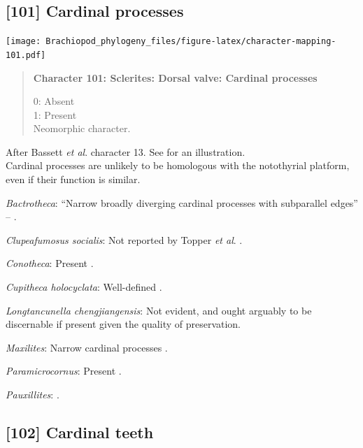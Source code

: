 \documentclass[openany]{book}
\begin{document}
\subsection*{{[}101{]} Cardinal processes}\label{cardinal-processes}

\texttt{[image: Brachiopod\_phylogeny\_files/figure-latex/character-mapping-101.pdf]}

\begin{quote}
\textbf{Character 101: Sclerites: Dorsal valve: Cardinal processes}

0: Absent\\
1: Present\\
Neomorphic character.
\end{quote}

After Bassett \emph{et al}.
\citeyearpar{Bassett2001Functionalmorphology} character 13. See
\citet{MartiMus2005} for an illustration.\\
Cardinal processes are unlikely to be homologous with the notothyrial
platform, even if their function is similar.

\hypertarget{Bactrotheca-coding-101}{}
\emph{Bactrotheca}: ``Narrow broadly diverging cardinal processes with
subparallel edges'' -- \citet{Valent2012}.

\hypertarget{Clupeafumosus_socialis-coding-101}{}
\emph{Clupeafumosus socialis}: Not reported by Topper \emph{et al}.
\citeyearpar{Topper2013Reappraisalof}.

\hypertarget{Conotheca-coding-101}{}
\emph{Conotheca}: Present \citep{Wrona2003}.

\hypertarget{Cupitheca_holocyclata-coding-101}{}
\emph{Cupitheca holocyclata}: Well-defined \citep{Skovsted2016}.

\hypertarget{Longtancunella_chengjiangensis-coding-101}{}
\emph{Longtancunella chengjiangensis}: Not evident, and ought arguably
to be discernable if present given the quality of preservation.

\hypertarget{Maxilites-coding-101}{}
\emph{Maxilites}: Narrow cardinal processes \citep{Marek1972}.

\hypertarget{Paramicrocornus-coding-101}{}
\emph{Paramicrocornus}: Present \citep{Zhang2018Ahyolithid}.

\hypertarget{Pauxillites-coding-101}{}
\emph{Pauxillites}: \citet{Marek1966}.

\subsection*{{[}102{]} Cardinal teeth}\label{cardinal-teeth}
\end{document}
